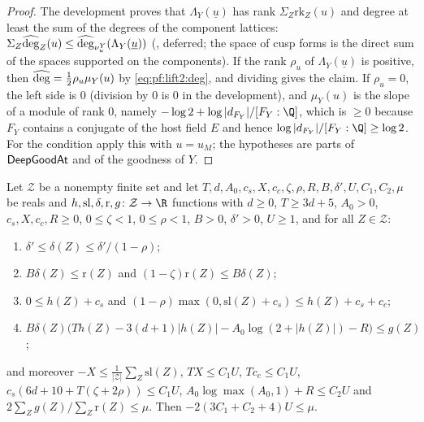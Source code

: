 \begin{proof}
The development proves that $\Lambda_Y(\underline u)$ has rank $\Sigma_Z\mathrm{rk}_Z(u)$ and degree at least the sum of
the degrees of the component lattices: $\Sigma_Z\widehat{\operatorname{deg}}_Z(u)\le\widehat{\operatorname{deg}}_{\nu^Y_u}(\Lambda_Y(\underline u))$
(, deferred; the space of cusp forms is the direct sum of
the spaces supported on the components). If the rank $\rho_u$ of $\Lambda_Y(\underline u)$ is positive, then
$\widehat{\operatorname{deg}}=\frac12\rho_u\mu_Y(u)$ by \eqref{eq:pf:lift2:deg}, and dividing gives the claim. If $\rho_u=0$, the
left side is $0$ (division by $0$ is $0$ in the development), and $\mu_Y(u)$ is the slope of a module of rank $0$,
namely $-\log2+\log|d_{F_Y}|/[F_Y:\Q]$, which is $\ge0$ because $F_Y$ contains a conjugate of the host field $E$ and
hence $\log|d_{F_Y}|/[F_Y:\Q]\ge\log2$. For the condition apply this with $u=u_M$; the hypotheses are parts of
$\mathsf{DeepGoodAt}$ and of the goodness of $Y$.
\end{proof}

\begin{lemma}\label{pf:lift2:avg}
Let $\mathcal Z$ be a nonempty finite set and let $T,d,A_0,c_s,X,c_c,\zeta,\rho,R,B,\delta',U,C_1,C_2,\mu$ be reals and
$h,\mathrm{sl},\delta,\mathrm r,g\colon\mathcal Z\to\R$ functions with $d\ge0$, $T\ge3d+5$, $A_0>0$, $c_s,X,c_c,R\ge0$,
$0\le\zeta<1$, $0\le\rho<1$, $B>0$, $\delta'>0$, $U\ge1$, and for all $Z\in\mathcal Z$:
\begin{enumerate}[label=(\arabic*)]
\item $\delta'\le\delta(Z)\le\delta'/(1-\rho)$;
\item $B\delta(Z)\le\mathrm r(Z)$ and $(1-\zeta)\mathrm r(Z)\le B\delta(Z)$;
\item $0\le h(Z)+c_s$ and $(1-\rho)\max(0,\mathrm{sl}(Z)+c_s)\le h(Z)+c_s+c_c$;
\item $B\delta(Z)\bigl(Th(Z)-3(d+1)|h(Z)|-A_0\log(2+|h(Z)|)-R\bigr)\le g(Z)$;
\end{enumerate}
and moreover $-X\le\frac1{|\mathcal Z|}\sum_Z\mathrm{sl}(Z)$, $TX\le C_1U$, $Tc_c\le C_1U$,
$c_s(6d+10+T(\zeta+2\rho))\le C_1U$, $A_0\log\max(A_0,1)+R\le C_2U$ and $2\sum_Zg(Z)/\sum_Z\mathrm r(Z)\le\mu$. Then
$-2(3C_1+C_2+4)U\le\mu$.
\end{lemma}

